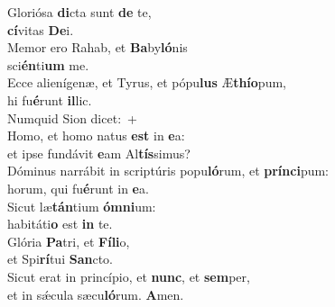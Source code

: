 \evenverse Gloriósa \textbf{di}cta sunt \textbf{de} te,~\*\\
\evenverse \textbf{cí}vitas \textbf{De}i.\\
\oddverse Memor ero Rahab, et \textbf{Ba}by\textbf{ló}nis~\*\\
\oddverse sci\textbf{én}ti\textbf{um} me.\\
\evenverse Ecce alienígenæ, et Tyrus, et pópu\textbf{lus} Æ\textbf{thí}\textbf{o}pum,~\*\\
\evenverse hi fu\textbf{é}runt \textbf{il}lic.\\
\oddverse Numquid Sion dicet:~+\\
\oddverse  Homo, et homo natus \textbf{est} in \textbf{e}a:~\*\\
\oddverse et ipse fundávit \textbf{e}am Al\textbf{tís}simus?\\
\evenverse Dóminus narrábit in scriptúris popu\textbf{ló}rum, et \textbf{prín}\textbf{ci}pum:~\*\\
\evenverse horum, qui fu\textbf{é}runt in \textbf{e}a.\\
\oddverse Sicut læ\textbf{tán}tium \textbf{óm}\textbf{ni}um:~\*\\
\oddverse habitáti\textbf{o} est \textbf{in} te.\\
\evenverse Glória \textbf{Pa}tri, et \textbf{Fí}\textbf{li}o,~\*\\
\evenverse et Spi\textbf{rí}tui \textbf{San}cto.\\
\oddverse Sicut erat in princípio, et \textbf{nunc}, et \textbf{sem}per,~\*\\
\oddverse et in sǽcula sæcu\textbf{ló}rum. \textbf{A}men.\\

